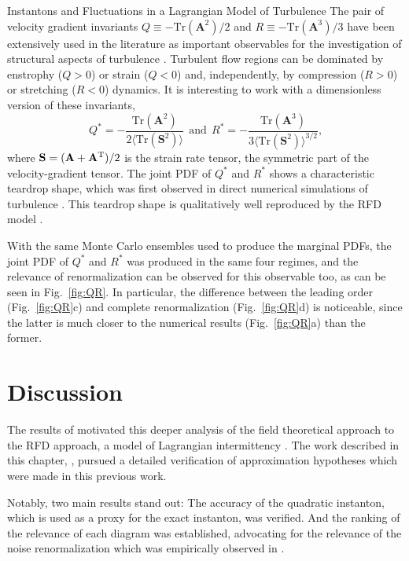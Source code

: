 \begin{chapter}{Instantons and Fluctuations in a Lagrangian Model of Turbulence}
The pair of velocity gradient invariants $Q \equiv - \mathrm{Tr}({\mathbf{A}}^2)/2$ and $R \equiv -\mathrm{Tr}({\mathbf{A}}^3)/3$ have been extensively used in the literature as important observables for the investigation of structural aspects of turbulence \parencite{TsinoberInformal}. Turbulent flow regions can be dominated by enstrophy ($Q>0$) or strain ($Q<0$) and, independently, by compression ($R>0$) or stretching ($R<0$) dynamics. It is interesting to work with a dimensionless version of these invariants, 
\begin{equation}
 Q^* = - \frac{\mathrm{Tr}({\mathbf{A}}^2)}{2 \langle \mathrm{Tr}(\mathbf{S}^2) \rangle } \ \ \mbox{and} \ \ 
 R^* = - \frac{\mathrm{Tr}({\mathbf{A}}^3)}{3 \langle \mathrm{Tr}(\mathbf{S}^2)  \rangle^{3/2} } \mbox{,}
\end{equation}
where $\mathbf{S} = ({\mathbf{A}} + {\mathbf{A}}^{\mathrm{T}})/2$ is the strain rate tensor, the symmetric part of the velocity-gradient tensor. The joint PDF of $Q^*$ and $R^*$ shows a characteristic teardrop shape, which was first observed in direct numerical simulations of turbulence \parencite{leorat1975turbulence,vieillefosse1982,vieillefosse1984}. This teardrop shape is qualitatively well reproduced by the RFD model \parencite{ChevPRL}.

With the same Monte Carlo ensembles used to produce the marginal PDFs, the joint PDF of $Q^*$ and $R^*$ was produced in the same four regimes, and the relevance of renormalization can be observed for this observable too, as can be seen in Fig.~\ref{fig:QR}. In particular, the difference between the leading order (Fig.~\ref{fig:QR}c) and complete renormalization (Fig.~\ref{fig:QR}d) is noticeable, since the latter is much closer to the numerical results (Fig.~\ref{fig:QR}a) than the former.

\section{Discussion}

The results of \textcite{moriconi2014} motivated this deeper analysis of the field theoretical approach to the RFD approach, a model of Lagrangian intermittency \parencite{ChevPRL}. The work described in this chapter, \textcite{apolinario2019instantons}, pursued a detailed verification of approximation hypotheses which were made in this previous work. 

Notably, two main results stand out: The accuracy of the quadratic instanton, which is used as a proxy for the exact instanton, was verified. And the ranking of the relevance of each diagram was established, advocating for the relevance of the noise renormalization which was empirically observed in \textcite{moriconi2014}.


\end{chapter}
